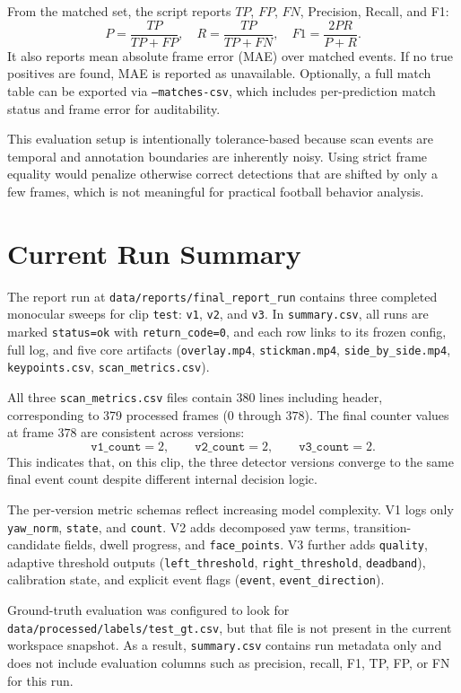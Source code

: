 \documentclass[11pt,a4paper]{article}
\begin{document}
From the matched set, the script reports \(TP\), \(FP\), \(FN\), Precision, Recall, and F1:
\[
P=\frac{TP}{TP+FP}, \quad
R=\frac{TP}{TP+FN}, \quad
F1=\frac{2PR}{P+R}.
\]
It also reports mean absolute frame error (MAE) over matched events. If no true positives are found, MAE is reported as unavailable. Optionally, a full match table can be exported via \texttt{--matches-csv}, which includes per-prediction match status and frame error for auditability.

This evaluation setup is intentionally tolerance-based because scan events are temporal and annotation boundaries are inherently noisy. Using strict frame equality would penalize otherwise correct detections that are shifted by only a few frames, which is not meaningful for practical football behavior analysis.

\section{Current Run Summary}
The report run at \texttt{data/reports/final\_report\_run} contains three completed monocular sweeps for clip \texttt{test}: \texttt{v1}, \texttt{v2}, and \texttt{v3}. In \texttt{summary.csv}, all runs are marked \texttt{status=ok} with \texttt{return\_code=0}, and each row links to its frozen config, full log, and five core artifacts (\texttt{overlay.mp4}, \texttt{stickman.mp4}, \texttt{side\_by\_side.mp4}, \texttt{keypoints.csv}, \texttt{scan\_metrics.csv}).

All three \texttt{scan\_metrics.csv} files contain 380 lines including header, corresponding to 379 processed frames (\(0\) through \(378\)). The final counter values at frame \(378\) are consistent across versions:
\[
\texttt{v1\_count}=2,\qquad
\texttt{v2\_count}=2,\qquad
\texttt{v3\_count}=2.
\]
This indicates that, on this clip, the three detector versions converge to the same final event count despite different internal decision logic.

The per-version metric schemas reflect increasing model complexity. V1 logs only \texttt{yaw\_norm}, \texttt{state}, and \texttt{count}. V2 adds decomposed yaw terms, transition-candidate fields, dwell progress, and \texttt{face\_points}. V3 further adds \texttt{quality}, adaptive threshold outputs (\texttt{left\_threshold}, \texttt{right\_threshold}, \texttt{deadband}), calibration state, and explicit event flags (\texttt{event}, \texttt{event\_direction}).

Ground-truth evaluation was configured to look for \texttt{data/processed/labels/test\_gt.csv}, but that file is not present in the current workspace snapshot. As a result, \texttt{summary.csv} contains run metadata only and does not include evaluation columns such as precision, recall, F1, TP, FP, or FN for this run.
\end{document}

